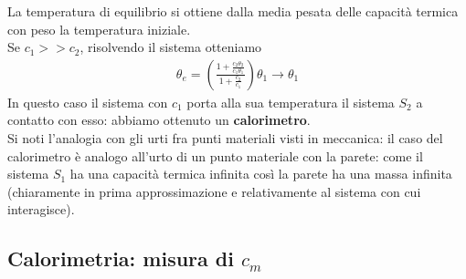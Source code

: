 \documentclass[
10pt, %
a4paper, %
oneside, %
headinclude,footinclude, %
BCOR5mm, %
]{scrartcl}
\begin{document}
La temperatura di equilibrio si ottiene dalla media pesata delle capacità termica con peso la temperatura iniziale.\\
Se $c_1>>c_2$, risolvendo il sistema otteniamo
\begin{align*} 
	\theta_e = \left(\frac{1+\frac{c_2\theta_2}{c_1\theta_1}}{1+\frac{c_2}{c_1}}\right)\theta_1 \to \theta_1
\end{align*} 
In questo caso il sistema con $c_1$ porta alla sua temperatura il sistema $S_2$ a contatto con esso: abbiamo ottenuto un \textbf{calorimetro}.\\
Si noti l'analogia con gli urti fra punti materiali visti in meccanica: il caso del calorimetro è analogo all'urto di un punto materiale con la parete: come il sistema $S_1$ ha una capacità termica infinita così la parete ha una massa infinita (chiaramente in prima approssimazione e relativamente al sistema con cui interagisce).
\subsection{Calorimetria: misura di $c_m$}
\end{document}
